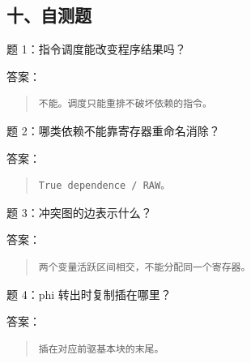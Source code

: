 \documentclass[UTF8,zihao=-4]{ctexart}
\begin{document}
\subsection{十、自测题}


题 1：指令调度能改变程序结果吗？


答案：


\begin{quote}
\footnotesize
\begin{verbatim}
不能。调度只能重排不破坏依赖的指令。
\end{verbatim}
\end{quote}


题 2：哪类依赖不能靠寄存器重命名消除？


答案：


\begin{quote}
\footnotesize
\begin{verbatim}
True dependence / RAW。
\end{verbatim}
\end{quote}


题 3：冲突图的边表示什么？


答案：


\begin{quote}
\footnotesize
\begin{verbatim}
两个变量活跃区间相交，不能分配同一个寄存器。
\end{verbatim}
\end{quote}


题 4：phi 转出时复制插在哪里？


答案：


\begin{quote}
\footnotesize
\begin{verbatim}
插在对应前驱基本块的末尾。
\end{verbatim}
\end{quote}
\end{document}
